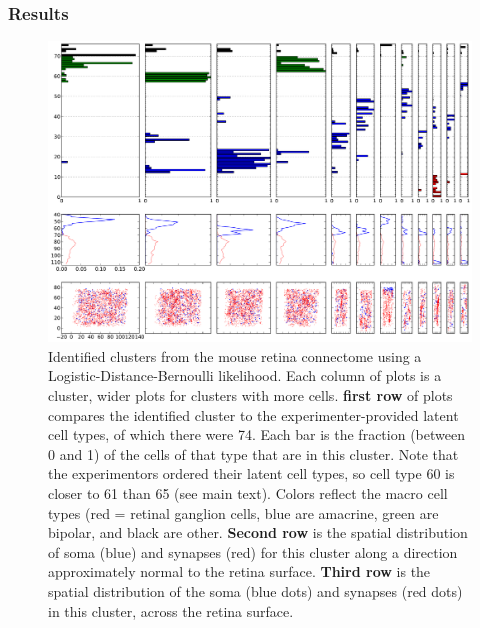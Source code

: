 \documentclass{article}
\begin{document}
\subsubsection{Results}

\begin{figure}
  \centering 
  \includegraphics[width=\textwidth]{mouseretina/retina.1.0.ld.0.0.data-fixed_20_100-anneal_slow_400.0.clusters.pdf}
  \caption{Identified clusters from the mouse retina connectome using a Logistic-Distance-Bernoulli likelihood. Each column of plots is a cluster, wider plots for clusters with more cells. \textbf{first row} of plots compares the identified cluster to the experimenter-provided latent cell types, of which there were 74. Each bar is the fraction (between 0 and 1) of the cells of that type that are in this cluster. Note that the experimentors ordered their latent cell types, so cell type 60 is closer to 61 than 65 (see main text). Colors reflect the macro cell types (red = retinal ganglion cells, blue are amacrine, green are bipolar, and black are other. \textbf{Second row} is the spatial distribution of soma (blue) and synapses (red) for this cluster along a direction approximately normal to the retina surface. \textbf{Third row} is the spatial distribution of the soma (blue dots) and synapses (red dots) in this cluster, across the retina surface.}
  \label{fig:mouseretina:clusters}
\end{figure}
\end{document}

